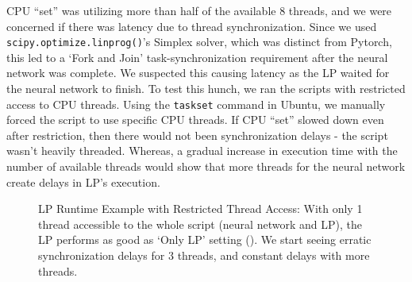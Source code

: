CPU ``set'' was utilizing more than half of the available 8 threads, and we were concerned if there was latency due to thread synchronization. Since we used \texttt{scipy.optimize.linprog()}'s Simplex solver, which was distinct from Pytorch, this led to a `Fork and Join' task-synchronization requirement \cite[Section 2.2]{IssuesMP} after the neural network was complete. We suspected this causing latency as the LP waited for the neural network to finish. To test this hunch, we ran the scripts with restricted access to CPU threads. Using the \texttt{taskset} command in Ubuntu, we manually forced the script to use specific CPU threads. If CPU ``set'' slowed down even after restriction, then there would not been synchronization delays - the script wasn't heavily threaded. Whereas, a gradual increase in execution time with the number of available threads would show that more threads for the neural network create delays in LP's execution.
\begin{figure}[!htbp]
    \centering
    \caption[LP Runtime Example with Restricted Thread Access]{LP Runtime Example with Restricted Thread Access: With only 1 thread accessible to the whole script (neural network and LP), the LP performs as good as `Only LP' setting (). We start seeing erratic synchronization delays for 3 threads, and constant delays with more threads.}
    \label{fig:LP Runtime Example with Restricted Thread Access}
\end{figure}

